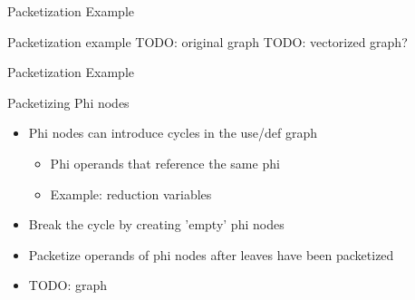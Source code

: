 \begin{frame}{Packetization Example}

Packetization example
TODO: original graph
TODO: vectorized graph?

\end{frame}


\begin{frame}[fragile]{Packetization Example}


\end{frame}


\begin{frame}[fragile]{Packetizing Phi nodes}

\begin{itemize}
    \item Phi nodes can introduce cycles in the use/def graph
    \begin{itemize}
        \item Phi operands that reference the same phi
        \item Example: reduction variables
    \end{itemize}
    \item Break the cycle by creating 'empty' phi nodes
    \item Packetize operands of phi nodes after leaves have been packetized
\end{itemize}

\begin{itemize}
    \item TODO: graph
\end{itemize}  

\end{frame}

